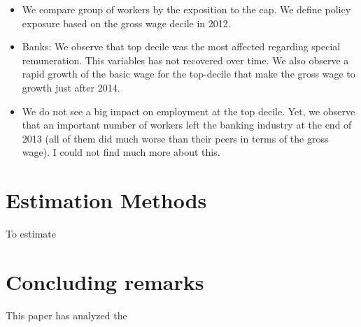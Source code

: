 \documentclass[12pt]{article}
\begin{document}
\begin{itemize}
\begin{enumerate}
		\end{enumerate}
	\item We compare group of workers by the exposition to the cap. We define policy exposure based on the gross wage decile in 2012. 
	\item Banks: We observe that top decile was the most affected regarding special remuneration. This variables has not recovered over time. We also observe a rapid growth of the basic wage for the top-decile that make the gross wage to growth just after 2014. 
	\item We do not see a big impact on employment at the top decile. Yet, we observe that an important number of workers left the banking industry at the end of 2013 (all of them did much worse than their peers in terms of the gross wage). I could not find much more about this. 
	
		
	\end{itemize}
	






\newpage
\section{Estimation Methods} \label{estimation_methods}

To estimate 

\newpage
\section{Concluding remarks} \label{conclusions}

This paper has analyzed the 


\newpage





%






\newpage
\end{document}
